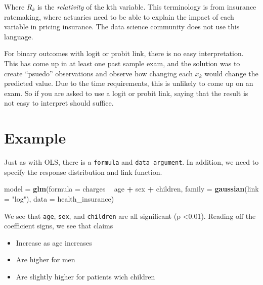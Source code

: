 \documentclass[]{book}
\newenvironment{Shaded}{\begin{snugshade}}{\end{snugshade}}
\newcommand{\DataTypeTok}[1]{\textcolor[rgb]{0.13,0.29,0.53}{#1}}
\newcommand{\KeywordTok}[1]{\textcolor[rgb]{0.13,0.29,0.53}{\textbf{#1}}}
\newcommand{\NormalTok}[1]{#1}
\newcommand{\OperatorTok}[1]{\textcolor[rgb]{0.81,0.36,0.00}{\textbf{#1}}}
\newcommand{\StringTok}[1]{\textcolor[rgb]{0.31,0.60,0.02}{#1}}
\providecommand{\tightlist}{%
  \setlength{\itemsep}{0pt}\setlength{\parskip}{0pt}}
\begin{document}
Where \(R_k\) is the \emph{relativity} of the kth variable. This terminology is from insurance ratemaking, where actuaries need to be able to explain the impact of each variable in pricing insurance. The data science community does not use this language.

For binary outcomes with logit or probit link, there is no easy interpretation. This has come up in at least one past sample exam, and the solution was to create ``psuedo'' observations and observe how changing each \(x_k\) would change the predicted value. Due to the time requirements, this is unlikely to come up on an exam. So if you are asked to use a logit or probit link, saying that the result is not easy to interpret should suffice.

\hypertarget{example-1}{%
\section{Example}\label{example-1}}

Just as with OLS, there is a \texttt{formula} and \texttt{data\ argument}. In addition, we need to specify the response distribution and link function.

\begin{Shaded}
\begin{Highlighting}[]
\NormalTok{model =}\StringTok{ }\KeywordTok{glm}\NormalTok{(}\DataTypeTok{formula =}\NormalTok{ charges }\OperatorTok{~}\StringTok{ }\NormalTok{age }\OperatorTok{+}\StringTok{ }\NormalTok{sex }\OperatorTok{+}\StringTok{ }\NormalTok{children, }
            \DataTypeTok{family =} \KeywordTok{gaussian}\NormalTok{(}\DataTypeTok{link =} \StringTok{"log"}\NormalTok{),}
            \DataTypeTok{data =}\NormalTok{ health_insurance)}
\end{Highlighting}
\end{Shaded}

We see that \texttt{age}, \texttt{sex}, and \texttt{children} are all significant (p \textless0.01). Reading off the coefficient signs, we see that claims

\begin{itemize}
\tightlist
\item
  Increase as age increases
\item
  Are higher for men
\item
  Are slightly higher for patients wich children
\end{itemize}

\begin{Shaded}
\end{Shaded}
\end{document}

